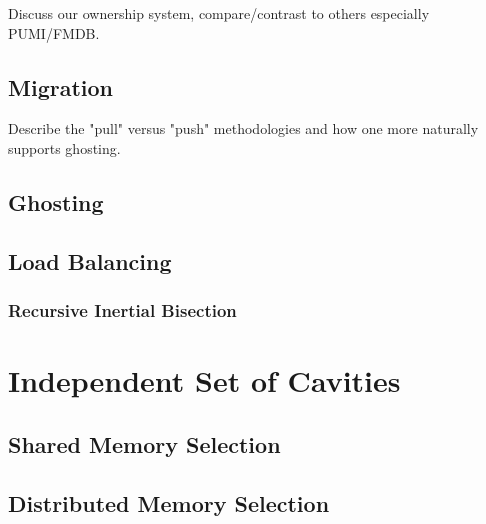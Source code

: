 Discuss our ownership system, compare/contrast to
others especially PUMI/FMDB.

\subsection{Migration}

Describe the "pull" versus "push" methodologies and
how one more naturally supports ghosting.

\subsection{Ghosting}

\subsection{Load Balancing}

\subsubsection{Recursive Inertial Bisection}

\section{Independent Set of Cavities}

\subsection{Shared Memory Selection}

\subsection{Distributed Memory Selection}


